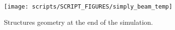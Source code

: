 \documentclass[11pt]{book}
\begin{document}
\begin{figure}[ht]
\center
\texttt{[image: scripts/SCRIPT\_FIGURES/simply\_beam\_temp]}
\caption[The  results]{Structures geometry at the end of the simulation.}
\label{simply_beam_deformed}
\end{figure}


\end{document}
